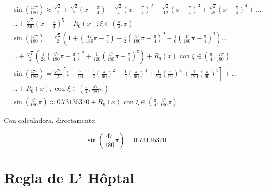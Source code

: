 \begin{align*}
	 & \sin\left(\frac{47\pi}{180}\right) \approx \frac{\sqrt{2}}{2}+\frac{\sqrt{2}}{2}\left(x-\frac{\pi}{4}\right)-\frac{\sqrt{2}}{4}\left(x-\frac{\pi}{4}\right)^2-\frac{\sqrt{2}}{12}\left(x-\frac{\pi}{4}\right)^3+\frac{\sqrt{2}}{48}\left(x-\frac{\pi}{4}\right)^4+\dots \\
	 & \dots+\frac{\sqrt{2}}{240}\left(x-\frac{\pi}{4}\right)^5+R_6(x);\xi \in \left(\frac{\pi}{4},x\right)                                                                                                                                                                    \\
	 & \sin \left(\frac{47\pi}{180}\right)=\frac{\sqrt{2}}{2}\left(1+\left(\frac{47}{180}\pi-\frac{\pi}{4}\right)-\frac{1}{2}\left(\frac{47}{180}\pi-\frac{\pi}{4}\right)^2-\frac{1}{6}\left(\frac{47}{180}\pi-\frac{\pi}{4}\right)^3\right)\dots                              \\
	 & \dots+\frac{\sqrt{2}}{2}\left(\frac{1}{24}\left(\frac{47}{180}\pi-\frac{\pi}{4}\right)^4+\frac{1}{120}\left(\frac{47}{180}\pi-\frac{\pi}{4}\right)^5\right)+R_6(x)\text{ con } \xi \in \left(\frac{\pi}{4},\frac{47\pi}{180}\right)                                     \\
	 & \sin \left(\frac{47\pi}{180}\right)=\frac{\sqrt{2}}{2}\left[1+\frac{\pi}{90}-\frac{1}{2}\left(\frac{\pi}{90}\right)^2-\frac{1}{6}\left(\frac{\pi}{90}\right)^3+\frac{1}{24}\left(\frac{\pi}{90}\right)^4 +\frac{1}{120}\left(\frac{\pi}{90}\right)^5\right]+\dots       \\
	 & \dots+R_6(x), \text{ con } \xi \in \left(\frac{\pi}{4},\frac{47}{180}\pi\right)                                                                                                                                                                                         \\
	 & \sin \left(\frac{47}{180}\pi\right)\approx 0.73135370+R_6(x) \text{ con } \xi\in \left(\frac{\pi}{4},\frac{47}{180}\pi\right)
\end{align*}

Con calculadora, directamente:

\begin{equation*}
	\sin \left(\frac{47}{180}\pi\right)=0.73135370
\end{equation*}

\section{Regla de L' Hôptal}


